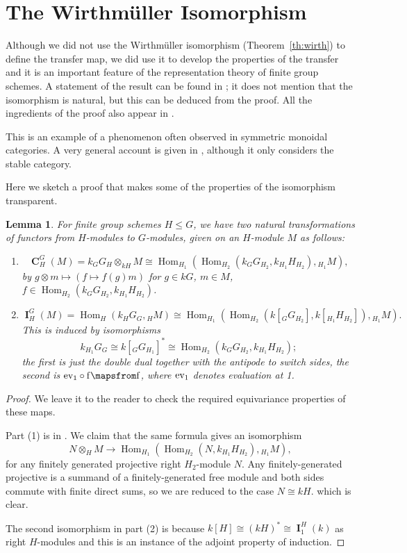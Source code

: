 \documentclass[12pt]{amsart}
\newtheorem{lemma}[theorem]{Lemma}
\theoremstyle{definition}
\newcommand{\eva}{\rm ev}
\DeclareMathOperator{\ind}{\mathbf{I}}
\DeclareMathOperator{\coind}{\mathbf{C}}
\DeclareMathOperator{\Hom}{Hom}
\begin{document}
\section{The Wirthm\"uller Isomorphism} \label{wirt}

Although we did not use the Wirthm\"uller isomorphism (Theorem~\ref{th:wirth}) to define the transfer map, we did use it to develop the properties of the transfer and it is an important feature of the representation theory of finite group schemes. A statement of the result can be found in \cite[I.8.17]{MR2015057}; it does not mention that the isomorphism is natural, but this can be deduced from the proof. All the ingredients of the proof also appear in \cite{MR347883}.

This is an example of a phenomenon often observed in symmetric monoidal categories. A very general account is given in  \cite[Example 4.6]{MR3542492}, although it only considers the stable category. 

Here we sketch a proof that makes some of the properties of the isomorphism transparent.

\begin{lemma}
	For finite group schemes $H \leq G$, we have two natural transformations of functors from $H$-modules to $G$-modules, given on an $H$-module $M$ as follows:
	\begin{enumerate}
		\item 
		$$\coind^G_H (M) = k {}_GG_H  \otimes_{kH}  M \cong \Hom_{H_1} (  \Hom _{H_2} (k {}_G G_{H_2}, k {}_{H_1}H_{H_2}), {}_{H_1}M),$$
		by $g \otimes m \mapsto (f \mapsto f(g)m)$ for $g \in kG$, $m \in M$, $f \in \Hom _{H_2} (k {}_G G_{H_2}, k {}_{H_1}H_{H_2})$.
		\item 
		$$\ind_H^G(M) = \Hom_H(k {}_H G_G , {}_H M) \cong \Hom_{H_1} (  \Hom _{H_2} (k [{}_G G_{H_2}], k [{}_{H_1}H_{H_2}]), {}_{H_1}M).$$
	This is induced by isomorphisms 
	$$k{}_{H_1}G_G \cong k[ {}_G G_{H_1} ]^* \cong \Hom _{H_2} (k {}_G G_{H_2}, k {}_{H_1}H_{H_2});$$
	the first is just the double dual together with the antipode to switch sides, the second is $\eva_1 \circ f \mapsfrom f$, where $\eva_1$ denotes evaluation at 1.
\end{enumerate}
\end{lemma}

\begin{proof}
	We leave it to the reader to check the required equivariance properties of these maps.
	
	Part (1) is in \cite[I 1.16]{MR2015057}. We claim that the same formula gives an isomorphism
	$$ N \otimes_H M \rightarrow \Hom_{H_1} (  \Hom _{H_2} (N, k {}_{H_1}H_{H_2}), {}_{H_1}M),$$
	for any finitely generated projective right $H_2$-module $N$. Any finitely-generated projective is a summand of a finitely-generated free module and both sides commute with finite direct sums, so we are reduced to the case $N \cong kH$. which is clear.
	
	The second isomorphism in part (2) is because $k[H] \cong (kH)^* \cong \ind_1^H(k)$ as right $H$-modules and this is an instance of the adjoint property of induction.
\end{proof}
\end{document}
